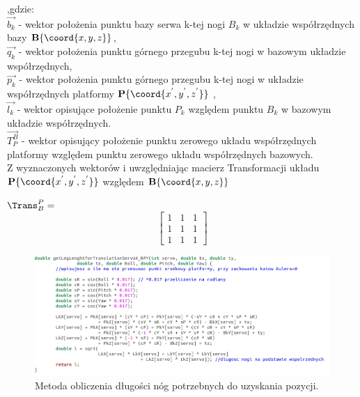 ,gdzie: \\ %
${\vec{b_k}}$ - wektor położenia punktu bazy serwa k-tej nogi $B_k$ w układzie współrzędnych bazy $\textbf{B}\{\coord{x,y,z}\}$, \\ 
${\vec{q_k}}$ - wektor położenia punktu górnego przegubu k-tej nogi w bazowym układzie współrzędnych, \\  
${\vec{p_k}}$ - wektor położenia punktu górnego przegubu k-tej nogi w układzie współrzędnych platformy $\textbf{P}\{\coord{x^{'},y^{'},z^{'}}\}$ , \\ 
${\vec{l_k}}$ - wektor opisujące położenie punktu $P_k$ względem punktu $B_k$ w bazowym układzie współrzędnych. \\
${\vec{T_P^{B}}}$ - wektor opisujący położenie punktu zerowego układu współrzędnych platformy względem punktu zerowego układu współrzędnych bazowych.
\\
Z wyznaczonych wektorów i uwzględniając macierz Transformacji układu $\textbf{P}\{\coord{x^{'},y^{'},z^{'}}\}$ względem $\textbf{B}\{\coord{x,y,z}\}$

$\Trans^{P}_{B} = $
\[
\begin{bmatrix}
1 & 1 & 1 \\
1 & 1 & 1 \\
1 & 1 & 1
\end{bmatrix}
\]



\begin{figure}[!h]
    \label{fig:anzelm}
    \centering
    \includegraphics[width=\textwidth]{img/kod_inverse_kinematics_1.png}
    \caption{Metoda obliczenia długości nóg potrzebnych do uzyskania pozycji.}
\end{figure}


